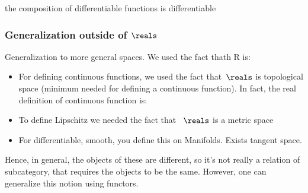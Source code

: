 {    \begin{example}
        the composition of differentiable functions is differentiable
    \end{example}


    \subsubsection{Generalization outside of $\reals$}
    Generalization to more general spaces.
    We used the fact thath R is:
    \begin{itemize}
        \item For defining continuous functions, we used the fact that~$\reals$ is topological space (minimum needed for defining a continuous function).
              In fact, the real definition of continuous function is:


        \item To define Lipschitz we needed the fact that~ $\reals$ is a metric space
        \item For differentiable, smooth, you define this on Manifolds.
              Exists tangent space.
    \end{itemize}

    Hence, in general, the objects of these are different, so it's not really a relation of subcategory, that requires the objects to be the same.
    However, one can generalize this notion using functors.

}

